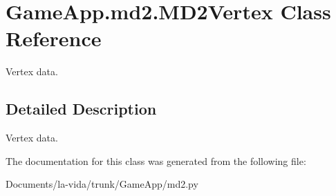\hypertarget{classGameApp_1_1md2_1_1MD2Vertex}{
\section{GameApp.md2.MD2Vertex Class Reference}
\label{classGameApp_1_1md2_1_1MD2Vertex}
}
Vertex data.  




\subsection{Detailed Description}
Vertex data. 

The documentation for this class was generated from the following file:\begin{CompactItemize}
\item 
Documents/la-vida/trunk/GameApp/md2.py\end{CompactItemize}

